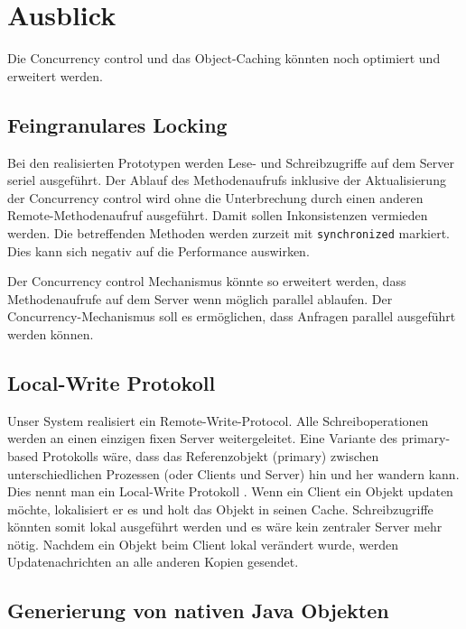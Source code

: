 \chapter{Ausblick}

Die Concurrency control und das Object-Caching könnten noch optimiert und erweitert werden.


\section{Feingranulares Locking}
\label{sec:feingr-lock}

Bei den realisierten Prototypen werden Lese- und Schreibzugriffe auf dem Server seriel ausgeführt. Der Ablauf des Methodenaufrufs inklusive der Aktualisierung der Concurrency control wird ohne die Unterbrechung durch einen anderen Remote-Methodenaufruf ausgeführt. Damit sollen Inkonsistenzen vermieden werden. Die betreffenden Methoden werden zur\-zeit mit \texttt{syn\-chro\-ni\-zed} markiert. Dies kann sich negativ auf die Performance auswirken. 

Der Concurrency control Mechanismus könnte so erweitert werden, dass Methodenaufrufe auf dem Server wenn möglich parallel ablaufen. 
Der Con\-cur\-ren\-cy-Me\-cha\-nis\-mus soll es ermöglichen, dass Anfragen parallel ausgeführt werden können.

\section{Local-Write Protokoll}
\label{sec:local-write-prot}

Unser System realisiert ein Remote-Write-Protocol. Alle Schreiboperationen werden an einen einzigen fixen Server weitergeleitet.
Eine Variante des primary-based Protokolls wäre, dass das Referenzobjekt (primary) zwischen unterschiedlichen Prozessen (oder Clients und Server) hin und her wandern kann. Dies nennt man ein Local-Write Protokoll \cite{tanenbaum07}. Wenn ein Client ein Objekt updaten möchte, lokalisiert er es und holt das Objekt in seinen Cache. Schreibzugriffe könnten somit lokal ausgeführt werden und es wäre kein zentraler Server mehr nötig. Nachdem ein Objekt beim Client lokal verändert wurde, werden Updatenachrichten an alle anderen Kopien gesendet.

\section{Generierung von nativen Java Objekten}
\label{sec:gener-von-nativ}

